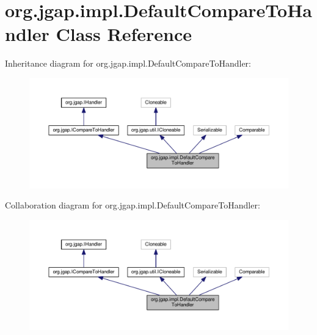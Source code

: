 \hypertarget{classorg_1_1jgap_1_1impl_1_1_default_compare_to_handler}{\section{org.\-jgap.\-impl.\-Default\-Compare\-To\-Handler Class Reference}
\label{classorg_1_1jgap_1_1impl_1_1_default_compare_to_handler}
}


Inheritance diagram for org.\-jgap.\-impl.\-Default\-Compare\-To\-Handler\-:
\nopagebreak
\begin{figure}[H]
\begin{center}
\leavevmode
\includegraphics[width=350pt]{classorg_1_1jgap_1_1impl_1_1_default_compare_to_handler__inherit__graph}
\end{center}
\end{figure}


Collaboration diagram for org.\-jgap.\-impl.\-Default\-Compare\-To\-Handler\-:
\nopagebreak
\begin{figure}[H]
\begin{center}
\leavevmode
\includegraphics[width=350pt]{classorg_1_1jgap_1_1impl_1_1_default_compare_to_handler__coll__graph}
\end{center}
\end{figure}
